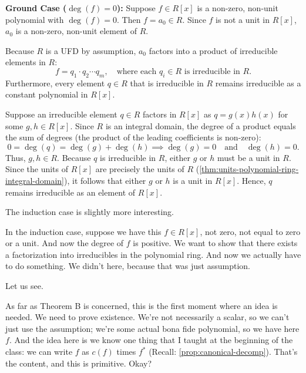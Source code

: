 \begin{proofWrapper}
\begin{content}[{Existence: Ground Case \texorpdfstring{($\deg(f) = 0$)}{(deg(f) = 0)}}]
\textbf{Ground Case ($\deg(f) = 0$):}
Suppose $f \in R[x]$ is a non-zero, non-unit polynomial with $\deg(f) = 0$.
Then $f = a_0 \in R$. Since $f$ is not a unit in $R[x]$, $a_0$ is a non-zero, non-unit element of $R$.

Because $R$ is a UFD by assumption, $a_0$ factors into a product of irreducible elements in $R$:
\[
f = q_1 \cdot q_2 \cdots q_m, \quad \text{where each } q_i \in R \text{ is irreducible in } R.
\]
Furthermore, every element $q \in R$ that is irreducible in $R$ remains irreducible as a constant polynomial in $R[x]$.

\begin{steps}
Suppose an irreducible element $q \in R$ factors in $R[x]$ as $q = g(x) h(x)$ for some $g, h \in R[x]$.
Since $R$ is an integral domain, the degree of a product equals the sum of degrees (the product of the leading coefficients is non-zero):
\[
0 = \deg(q) = \deg(g) + \deg(h) \implies \deg(g) = 0 \quad \text{and} \quad \deg(h) = 0.
\]
Thus, $g, h \in R$. Because $q$ is irreducible in $R$, either $g$ or $h$ must be a unit in $R$. Since the units of $R[x]$ are precisely the units of $R$ (\cref{thm:units-polynomial-ring-integral-domain}), it follows that either $g$ or $h$ is a unit in $R[x]$. Hence, $q$ remains irreducible as an element of $R[x]$.
\end{steps}
\end{content}

\begin{speech}[00:23:58 - 00:25:57]
The induction case is slightly more interesting.

In the induction case, suppose we have this $f \in R[x]$, not zero, not equal to zero or a unit.  And now the degree of $f$ is positive. We want to show that there exists a factorization into irreducibles in the polynomial ring. And now we actually have to do something. We didn't here, because that was just assumption.

Let us see.

As far as Theorem B is concerned, this is the first moment where an idea is needed. We need to prove existence. We're not necessarily a scalar, so we can't just use the assumption; we're some actual bona fide polynomial, so we have here $f$. And the idea here is we know one thing that I taught at the beginning of the class: we can write $f$ as $c(f)$ times $f^*$ (Recall: \cref{prop:canonical-decomp}).  That's the content, and this is primitive.  Okay?


\end{speech}
\end{proofWrapper}
